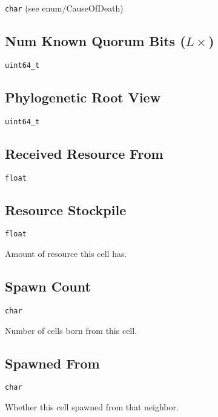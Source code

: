 \texttt{char}
(see enum/CauseOfDeath)

\subsection{Num Known Quorum Bits ($L\times$)}

\texttt{uint64\_t}

\subsection{Phylogenetic Root View}

\texttt{uint64\_t}

\subsection{Received Resource From}

\texttt{float}

\subsection{Resource Stockpile}

\texttt{float}

Amount of resource this cell has.

\subsection{Spawn Count}

\texttt{char}

Number of cells born from this cell.

\subsection{Spawned From}

\texttt{char}

Whether this cell spawned from that neighbor.